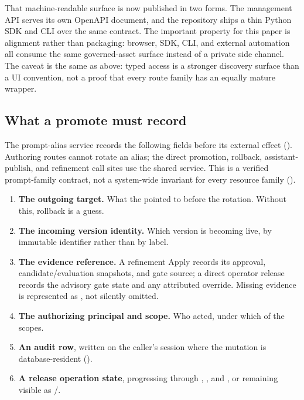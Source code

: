 That machine-readable surface is now published in two forms. The management API
serves its own OpenAPI document, and the repository ships a thin Python SDK and
CLI over the same contract. The important property for this paper is alignment
rather than packaging: browser, SDK, CLI, and external automation all consume the
same governed-asset surface instead of a private side channel. The caveat is the
same as above: typed access is a stronger discovery surface than a UI convention,
not a proof that every route family has an equally mature wrapper.

\subsection{What a promote must record}

The prompt-alias service records the following fields before its external effect
(). Authoring routes cannot rotate an alias; the direct
promotion, rollback, assistant-publish, and refinement  call sites use
the shared service. This is a verified prompt-family contract, not a system-wide
invariant for every resource family ().

\begin{enumerate}[leftmargin=1.5em]
\item \textbf{The outgoing target.} What the \livetarget{} pointed to before the
      rotation. Without this, rollback is a guess.
\item \textbf{The incoming version identity.} Which version is becoming live, by
      immutable identifier rather than by label.
\item \textbf{The evidence reference.} A refinement Apply records its approval,
      candidate/evaluation snapshots, and gate source; a direct operator release
      records the advisory gate state and any attributed override. Missing evidence
      is represented as , not silently omitted.
\item \textbf{The authorizing principal and scope.} Who acted, under which of the
      \statScopesW{} scopes.
\item \textbf{An audit row}, written on the caller's session where the mutation is
      database-resident ().
\item \textbf{A release operation state}, progressing through
      , , and , or remaining visible
      as /.
\end{enumerate}

